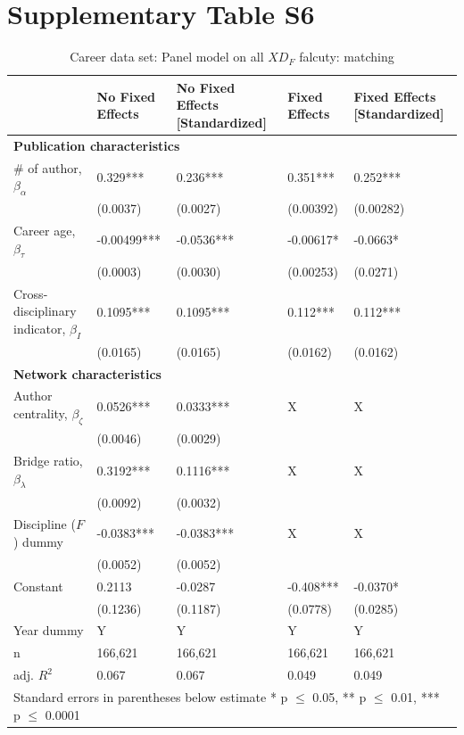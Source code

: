 \documentclass[10pt]{article}          %
\begin{document}
\newpage
\section{Supplementary Table S6}
\begin{table}[H]
\begin{tabular}{m{5cm} m{3.0cm} m{3cm} m{2.5cm} m{2.7cm}}
\hline
\hline
& \textbf{No Fixed Effects} & \textbf{No Fixed Effects [Standardized]} & \textbf{Fixed Effects} & \textbf{Fixed Effects [Standardized]} \\ \hline
\multicolumn{5}{l}{\textbf{Publication characteristics}} \\
\rowcolor{lightgray}
{\# of author, $\beta_\alpha$} & 0.329***  & 0.236*** & 0.351*** & 0.252*** \\
                             & (0.0037) & (0.0027) & (0.00392) & (0.00282) \\
\rowcolor{lightgray}
{Career age, $\beta_\tau$} & -0.00499*** & -0.0536*** & -0.00617* & -0.0663* \\
                         & (0.0003) & (0.0030) & (0.00253) & (0.0271) \\
\rowcolor{lightgray}
{Cross-disciplinary indicator, $\beta_I$} & 0.1095*** & 0.1095*** &  0.112*** & 0.112*** \\
                                        & (0.0165) & (0.0165) & (0.0162) & (0.0162) \\ \hline
\multicolumn{5}{l}{\textbf{Network characteristics}} \\
\rowcolor{lightgray}
{Author centrality, $\beta_\zeta$} & 0.0526*** & 0.0333*** & X & X \\
                             & (0.0046) & (0.0029) &  &  \\
\rowcolor{lightgray}
{Bridge ratio, $\beta_\lambda$} & 0.3192*** & 0.1116*** & X & X \\
                             & (0.0092) & (0.0032) & & \\
\rowcolor{lightgray}
{Discipline ($F$) dummy}     & -0.0383*** & -0.0383*** & X & X \\
                             & (0.0052) & (0.0052) & & \\
\rowcolor{lightgray}
{Constant}                 & 0.2113 & -0.0287 & -0.408*** & -0.0370* \\
                         & (0.1236) & (0.1187) & (0.0778) & (0.0285) \\
\rowcolor{lightgray}
{Year dummy}            & Y & Y & Y & Y \\ \hline
\rowcolor{lightgray}
{n}                      & 166,621 & 166,621 & 166,621 & 166,621 \\
\rowcolor{lightgray}
{adj. $R^2$}             & 0.067 & 0.067 & 0.049 & 0.049 \\ \hline \hline
\multicolumn{5}{l}{\footnotesize{Standard errors in parentheses below estimate * p $\leq$ 0.05, ** p $\leq$ 0.01, *** p $\leq$ 0.0001}}

\end{tabular}
\caption{Career data set: Panel model on all $XD_F$ falcuty: matching}
\label{tbl:sT5}
\end{table}

\bigskip   %
\end{document}
